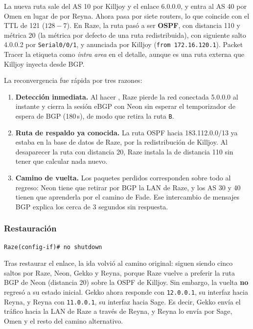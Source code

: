 La nueva ruta sale del AS 10 por Killjoy y el enlace 6.0.0.0, y entra al AS 40 por Omen en lugar de por Reyna. Ahora pasa por siete routers, lo que coincide con el TTL de 121 ($128-7$). En Raze, la ruta pasó a ser \textbf{OSPF}, con distancia 110 y métrica 20 (la métrica por defecto de una ruta redistribuida), con siguiente salto 4.0.0.2 por \texttt{Serial0/0/1}, y anunciada por Killjoy (\texttt{from 172.16.120.1}). Packet Tracer la etiqueta como \textit{intra area} en el detalle, aunque es una ruta externa que Killjoy inyecta desde BGP.

La reconvergencia fue rápida por tres razones:
\begin{enumerate}[nosep]
  \item \textbf{Detección inmediata.} Al hacer , Raze pierde la red conectada 5.0.0.0 al instante y cierra la sesión eBGP con Neon sin esperar el temporizador de espera de BGP (180\,s), de modo que retira la ruta \texttt{B}.
  \item \textbf{Ruta de respaldo ya conocida.} La ruta OSPF hacia 183.112.0.0/13 ya estaba en la base de datos de Raze, por la redistribución de Killjoy. Al desaparecer la ruta con distancia 20, Raze instala la de distancia 110 sin tener que calcular nada nuevo.
  \item \textbf{Camino de vuelta.} Los paquetes perdidos corresponden sobre todo al regreso: Neon tiene que retirar por BGP la LAN de Raze, y los AS 30 y 40 tienen que aprenderla por el camino de Fade. Ese intercambio de mensajes BGP explica los cerca de 3 segundos sin respuesta.
\end{enumerate}

\subsubsection*{Restauración}

\begin{lstlisting}
Raze(config-if)# no shutdown
\end{lstlisting}


Tras restaurar el enlace, la ida volvió al camino original: siguen siendo cinco saltos por Raze, Neon, Gekko y Reyna, porque Raze vuelve a preferir la ruta BGP de Neon (distancia 20) sobre la OSPF de Killjoy. Sin embargo, la vuelta \textbf{no} regresó a su estado inicial. Gekko ahora responde con \texttt{12.0.0.1}, su interfaz hacia Reyna, y Reyna con \texttt{11.0.0.1}, su interfaz hacia Sage. Es decir, Gekko envía el tráfico hacia la LAN de Raze a través de Reyna, y Reyna lo envía por Sage, Omen y el resto del camino alternativo.

